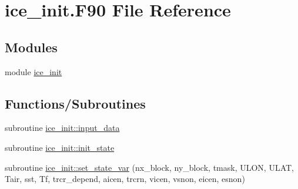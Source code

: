 \hypertarget{ice__init_8F90}{
\section{ice\_\-init.F90 File Reference}
\label{ice__init_8F90}
}
\subsection*{Modules}
\begin{DoxyCompactItemize}
\item 
module \hyperlink{namespaceice__init}{ice\_\-init}
\end{DoxyCompactItemize}
\subsection*{Functions/Subroutines}
\begin{DoxyCompactItemize}
\item 
subroutine \hyperlink{namespaceice__init_a8aeb5361cfea01402260b8b2727a2f4a}{ice\_\-init::input\_\-data}
\item 
subroutine \hyperlink{namespaceice__init_aafefd572779d7e57a1c62b63ecec3813}{ice\_\-init::init\_\-state}
\item 
subroutine \hyperlink{namespaceice__init_a4b7d50da13bea3bc9e8c7f2e042963ec}{ice\_\-init::set\_\-state\_\-var} (nx\_\-block, ny\_\-block, tmask, ULON, ULAT, Tair, sst, Tf, trcr\_\-depend, aicen, trcrn, vicen, vsnon, eicen, esnon)
\end{DoxyCompactItemize}
